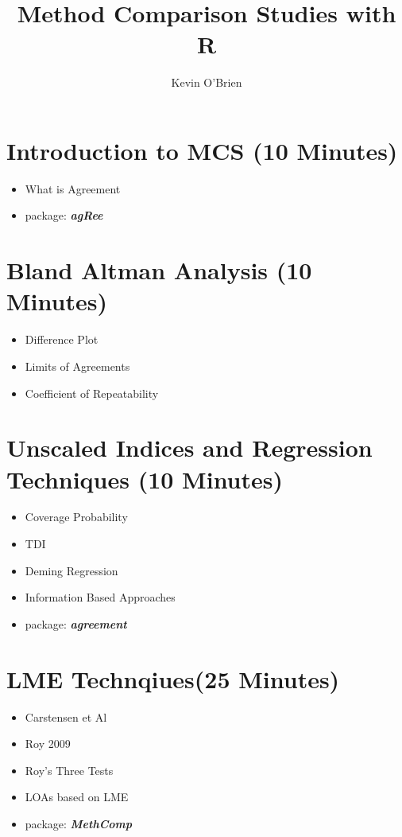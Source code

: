 \documentclass[]{article}
\title{Method Comparison Studies with R}
\author{Kevin O'Brien}
\begin{document}
\maketitle

\section{Introduction to MCS (10 Minutes)}
\begin{itemize}
\item What is Agreement
\item package: \textbf{\textit{agRee}}
\end{itemize}

\section{Bland Altman Analysis (10 Minutes)}
\begin{itemize}
\item Difference Plot
\item Limits of Agreements
\item Coefficient of Repeatability


\end{itemize}

\section{Unscaled Indices and Regression Techniques (10 Minutes)}
\begin{itemize}
\item Coverage Probability
\item TDI
\item Deming Regression
\item Information Based Approaches
\item package: \textbf{\textit{agreement}}
\end{itemize}

\section{LME Technqiues(25 Minutes)}
\begin{itemize}
\item Carstensen et Al
\item Roy 2009
\item Roy's Three Tests
\item LOAs based on LME
\item package: \textbf{\textit{MethComp}}
\end{itemize}
\end{document}
